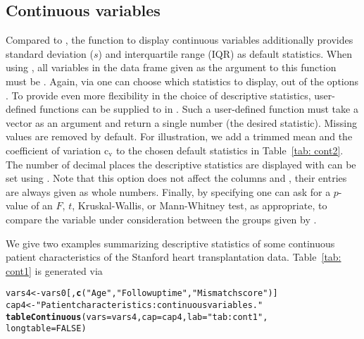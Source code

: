 \documentclass[nojss]{jss}\usepackage[]{graphicx}\usepackage[]{color}
\makeatletter
\newcommand{\hlnum}[1]{\textcolor[rgb]{0.686,0.059,0.569}{#1}}%
\newcommand{\hlstr}[1]{\textcolor[rgb]{0.192,0.494,0.8}{#1}}%
\newcommand{\hlstd}[1]{\textcolor[rgb]{0.345,0.345,0.345}{#1}}%
\newcommand{\hlkwb}[1]{\textcolor[rgb]{0.69,0.353,0.396}{#1}}%
\newcommand{\hlkwc}[1]{\textcolor[rgb]{0.333,0.667,0.333}{#1}}%
\newcommand{\hlkwd}[1]{\textcolor[rgb]{0.737,0.353,0.396}{\textbf{#1}}}%
\newenvironment{kframe}{%
 \def\at@end@of@kframe{}%
 \ifinner\ifhmode%
  \def\at@end@of@kframe{\end{minipage}}%
  \begin{minipage}{\columnwidth}%
 \fi\fi%
 \def\FrameCommand##1{\hskip\@totalleftmargin \hskip-\fboxsep
 \colorbox{shadecolor}{##1}\hskip-\fboxsep
     \hskip-\linewidth \hskip-\@totalleftmargin \hskip\columnwidth}%
 \MakeFramed {\advance\hsize-\width
   \@totalleftmargin\z@ \linewidth\hsize
   \@setminipage}}%
 {\par\unskip\endMakeFramed%
 \at@end@of@kframe}
\newenvironment{knitrout}{}{} %
\makeatother
\begin{document}
\subsection{Continuous variables}
Compared to , the function  to display continuous variables additionally provides 
standard deviation ($s$) and interquartile range (IQR) as default statistics. 
When using , all variables in the data frame given as the  argument to this function must be 
. Again, via  one can choose which statistics to 
display, out of the options . 
To provide even more flexibility in the choice of descriptive statistics, user-defined functions can be supplied
to  in . Such a user-defined function must take a vector as an argument and return
a single number (the desired statistic). Missing values are removed by default. For illustration, we add a trimmed mean
and the coefficient of variation c$_{\mathrm{v}}$ to the chosen default statistics in Table~\ref{tab: cont2}. 
The number of decimal places the descriptive statistics are displayed with can be set using .
Note that this option does not affect the columns  and , their entries are always given as 
whole numbers.
Finally, by specifying  one can ask for a $p$-value of an $F$, $t$, Kruskal-Wallis, or Mann-Whitney test,
as appropriate, to compare the variable under consideration between the groups given by .

We give two examples summarizing descriptive statistics of some continuous patient characteristics
of the Stanford heart transplantation data. Table~\ref{tab: cont1} is generated via 

\begin{knitrout}\footnotesize
{}\color{fgcolor}\begin{kframe}
\begin{alltt}
\hlstd{vars4} \hlkwb{<-} \hlstd{vars0[,} \hlkwd{c}\hlstd{(}\hlstr{"Age"}\hlstd{,} \hlstr{"Follow up time"}\hlstd{,} \hlstr{"Mismatch score"}\hlstd{)]}
\hlstd{cap4} \hlkwb{<-} \hlstr{"Patient characteristics: continuous variables."}
\hlkwd{tableContinuous}\hlstd{(}\hlkwc{vars} \hlstd{= vars4,} \hlkwc{cap} \hlstd{= cap4,} \hlkwc{lab} \hlstd{=} \hlstr{"tab: cont1"}\hlstd{,}
  \hlkwc{longtable} \hlstd{=} \hlnum{FALSE}\hlstd{)}
\end{alltt}
\end{kframe}
\end{knitrout}
\end{document}
